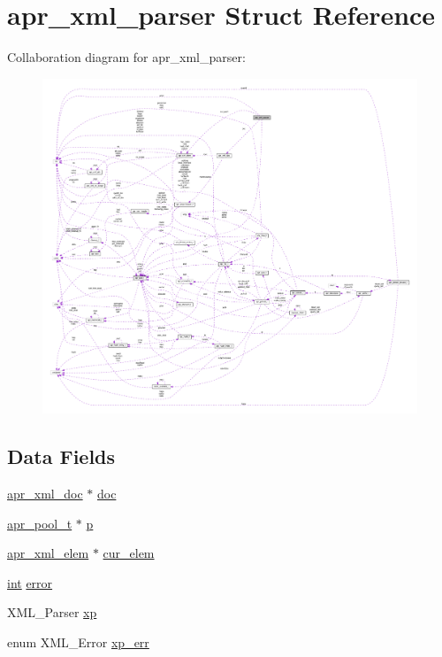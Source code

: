 \hypertarget{structapr__xml__parser}{}\section{apr\+\_\+xml\+\_\+parser Struct Reference}
\label{structapr__xml__parser}


Collaboration diagram for apr\+\_\+xml\+\_\+parser\+:
\nopagebreak
\begin{figure}[H]
\begin{center}
\leavevmode
\includegraphics[width=350pt]{structapr__xml__parser__coll__graph}
\end{center}
\end{figure}
\subsection*{Data Fields}
\begin{DoxyCompactItemize}
\item 
\hyperlink{structapr__xml__doc}{apr\+\_\+xml\+\_\+doc} $\ast$ \hyperlink{structapr__xml__parser_aacdff4b456d676678bffd587c32eeabd}{doc}
\item 
\hyperlink{structapr__pool__t}{apr\+\_\+pool\+\_\+t} $\ast$ \hyperlink{structapr__xml__parser_a62641d2b545ad727ae89414e3181934d}{p}
\item 
\hyperlink{structapr__xml__elem}{apr\+\_\+xml\+\_\+elem} $\ast$ \hyperlink{structapr__xml__parser_a2cef7d75007f02442d80654ab95cfc0f}{cur\+\_\+elem}
\item 
\hyperlink{pcre_8txt_a42dfa4ff673c82d8efe7144098fbc198}{int} \hyperlink{structapr__xml__parser_ae2b43f4b54cf6994c1eace29eafd5c87}{error}
\item 
X\+M\+L\+\_\+\+Parser \hyperlink{structapr__xml__parser_a89f057a36ac193b51a002780f9845a45}{xp}
\item 
enum X\+M\+L\+\_\+\+Error \hyperlink{structapr__xml__parser_ad3de52fb8602ae90814374b14f1539e8}{xp\+\_\+err}
\end{DoxyCompactItemize}



